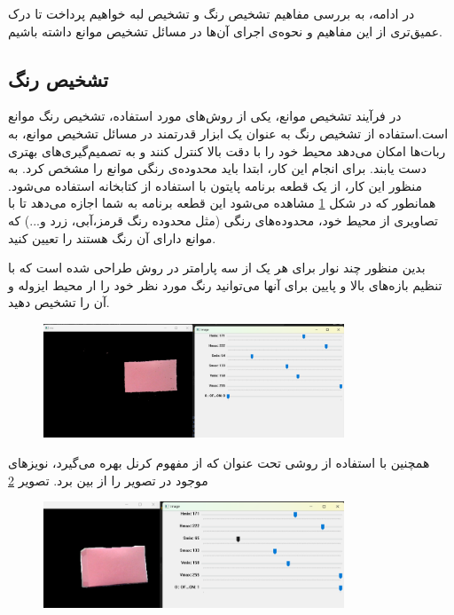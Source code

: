 در ادامه، به بررسی مفاهیم تشخیص رنگ و تشخیص لبه خواهیم پرداخت تا درک عمیق‌تری از این مفاهیم و نحوه‌ی اجرای آن‌ها در مسائل تشخیص موانع داشته باشیم.

\subsection{تشخیص رنگ}
در فرآیند تشخیص موانع، یکی از روش‌های مورد استفاده، تشخیص رنگ موانع است.استفاده از تشخیص رنگ به عنوان یک ابزار قدرتمند در مسائل تشخیص موانع، به ربات‌ها امکان می‌دهد محیط خود را با دقت بالا کنترل کنند و به تصمیم‌گیری‌های بهتری دست یابند. برای انجام این کار، ابتدا باید محدوده‌ی رنگی موانع را مشخص کرد. به منظور این کار، از یک قطعه برنامه پایتون با استفاده از کتابخانه
استفاده می‌شود. همانطور که در شکل
\ref{ColorCalibration}
مشاهده می‌شود این قطعه برنامه به شما اجازه می‌دهد تا با تصاویری از محیط خود، محدوده‌های رنگی (مثل محدوده رنگ قرمز،آبی، زرد و...) که موانع دارای آن رنگ هستند را تعیین کنید.

بدین منظور چند نوار برای هر یک از سه پارامتر در روش
طراحی شده است که با تنظیم بازه‌های بالا و پایین برای آنها می‌توانید رنگ مورد نظر خود را ار محیط ایزوله و آن را تشخیص دهید.

\begin{figure}[H]
	\centering
	\includegraphics[width=0.8\textwidth]{./images/Chapter2/FindColorBoundry}	
	\caption[]{}
	\label{ColorCalibration}
\end{figure}
\noindent
\unskip

همچنین با استفاده از روشی تحت عنوان
که از مفهوم کرنل بهره می‌گیرد، نویز‌های موجود در تصویر را از بین برد.
تصویر
\ref{ColorCalibrationMorph}
\begin{figure}[H]
	\centering
	\includegraphics[width=0.8\textwidth]{./images/Chapter2/FindColorBoundryMorphologyOn}	
	\caption[]{}
	\label{ColorCalibrationMorph}
\end{figure}
\noindent
\unskip


